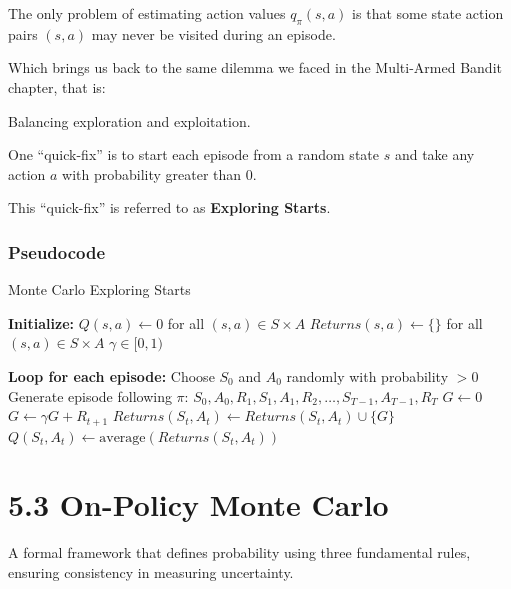 \documentclass[
  letterpaper,
  DIV=11,
  numbers=noendperiod]{scrreprt}
\begin{document}
The only problem of estimating action values \(q_{\pi}(s,a)\) is that
some state action pairs \((s,a)\) may never be visited during an
episode.

Which brings us back to the same dilemma we faced in the Multi-Armed
Bandit chapter, that is:

Balancing exploration and exploitation.

One ``quick-fix'' is to start each episode from a random state \(s\) and
take any action \(a\) with probability greater than \(0\).

This ``quick-fix'' is referred to as \textbf{Exploring Starts}.

\subsection{Pseudocode}\label{pseudocode-6}

\begin{algorithm}[htb!]
\caption{Monte Carlo Exploring Starts}
\begin{algorithmic}[1]
\State \textbf{Initialize:} 
\State $Q(s, a) \gets 0$ for all $(s, a) \in S \times A$
\State $Returns(s, a) \gets \{\}$ for all $(s, a) \in S \times A$
\State $\gamma \in [0, 1)$

\State \textbf{Loop for each episode:}
\State Choose $S_{0}$ and $A_{0}$ randomly with probability $> 0$
\State Generate episode following $\pi$: $S_{0}, A_{0}, R_{1}, S_{1}, A_{1}, R_{2}, \dots, S_{T-1}, A_{T-1}, R_{T}$
\State $G \gets 0$
    \State $G \gets \gamma G + R_{t+1}$
      
        \State $Returns(S_{t}, A_{t}) \gets Returns(S_{t}, A_{t}) \cup \{G\}$
        \State $Q(S_{t}, A_{t}) \gets \text{average}(Returns(S_{t}, A_{t}))$
    \Endif
\Endfor

\end{algorithmic}
\end{algorithm}

\chapter{5.3 On-Policy Monte Carlo}\label{on-policy-monte-carlo-1}

\begin{tcolorbox}[enhanced jigsaw, colback=white, left=2mm, breakable, opacityback=0, bottomrule=.15mm, rightrule=.15mm, arc=.35mm, colframe=quarto-callout-note-color-frame, leftrule=.75mm, toprule=.15mm]

A formal framework that defines probability using three fundamental
rules, ensuring consistency in measuring uncertainty. 🎲

\end{tcolorbox}
\end{document}
